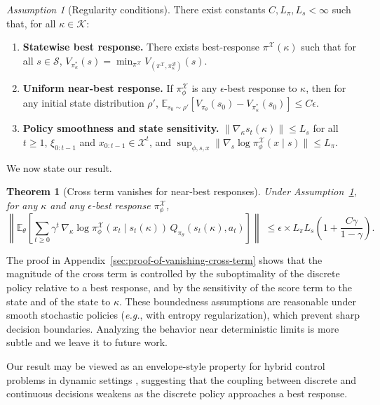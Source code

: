 \documentclass{article}
\newtheorem{theorem}{Theorem}
\theoremstyle{definition}
\theoremstyle{remark}
\newtheorem{assumption}{Assumption}
\newcommand{\eg}{{\em e.g.\/}, }
\begin{document}
\begin{assumption}[Regularity conditions]
\label{ass:regularity-cross-term}
There exist constants $C, L_\pi, L_s < \infty$ such that, for all $\kappa \in \mathcal{K}$:
\begin{enumerate}[leftmargin=*, noitemsep]
    \item \textbf{Statewise best response.} There exists best-response $\pi^{\mathcal{X}}(\kappa)$ such that for all $s \in \mathcal{S}$, $V_{\pi^*_\kappa}(s) = \min_{\pi^{\mathcal{X}}} V_{(\pi^{\mathcal{X}}, \pi^{\mathcal{B}}_\kappa)}(s)$.
    \item \textbf{Uniform near-best response.} If $\pi^{\mathcal{X}}_\phi$ is %
    any $\epsilon$-best response to $\kappa$, then for any initial state distribution $\rho'$, $\mathbb{E}_{s_0 \sim \rho'}[V_{\pi_{\theta}}(s_0) - V_{\pi^*_\kappa}(s_0)] \leq C \epsilon$.
    \item \textbf{Policy smoothness and state sensitivity.} 
    $\|\nabla_\kappa s_t(\kappa)\| \leq L_s$ for all $t\geq 1$, $\xi_{0:t-1}$ and $x_{0:t-1} \in \mathcal X^{t}$, and $\sup_{\phi, s, x} \|\nabla_s \log \pi^{\mathcal{X}}_\phi(x \mid s)\| \leq L_\pi$.
\end{enumerate}
\end{assumption}

We now state our result.
\begin{theorem}[Cross term vanishes for near-best responses]
\label{thm:cross-term-vanishes-for-near-opt}
Under Assumption~\ref{ass:regularity-cross-term}, for any $\kappa$ and any $\epsilon$-best response $\pi^{\mathcal{X}}_\phi$,
\[
\left\|
\mathbb{E}_{\theta}\!\left[
\sum_{t\geq 0}
\gamma^{t}\,
\nabla_{\kappa}\log \pi^{\mathcal{X}}_{\phi}\!\left(x_t \mid s_t(\kappa)\right)\,
Q_{\pi_{\theta}}(s_t(\kappa),a_t)
\right]
\right\|
\;\leq \epsilon  \times  L_{\pi} L_s  \left(1 + \frac{C \gamma}{1 - \gamma} \right).
\]
\end{theorem}

The proof in Appendix~\ref{sec:proof-of-vanishing-cross-term} shows that the magnitude of the cross term is controlled by the suboptimality of the discrete policy relative to a best response, and by the sensitivity of the score term to the state and of the state to $\kappa$. 
These boundedness assumptions are reasonable under smooth stochastic policies (\eg with entropy regularization), which prevent sharp decision boundaries. Analyzing the behavior near deterministic limits is more subtle and we leave it to future work.

Our result may be viewed as an envelope-style property for hybrid control problems in dynamic settings \citep{milgrom2002envelope,danskin1966theory}, suggesting that the coupling between discrete and continuous decisions weakens as the discrete policy approaches a best response. 
\end{document}
